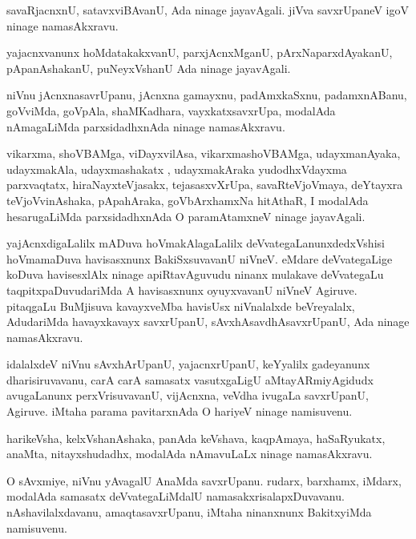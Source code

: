 \documentclass{article}
\begin{document}
\begin{mn}
savaRjacnxnU, satavxviBAvanU, Ada ninage jayavAgali.  jiVva savxrUpaneV igoV ninage namasAkxravu.
\end{mn}

\begin{mn}
yajacnxvanunx  hoMdatakakxvanU, parxjAcnxMganU, pArxNaparxdAyakanU, pApanAshakanU, puNeyxVshanU Ada ninage jayavAgali.
\end{mn}

\begin{mn}
niVnu jAcnxnasavrUpanu, jAcnxna gamayxnu,  padAmxkaSxnu,  padamxnABanu, 
goVviMda, goVpAla, shaMKadhara, vayxkatxsavxrUpa, modalAda nAmagaLiMda 
parxsidadhxnAda ninage namasAkxravu.
\end{mn}

\begin{mn}
vikarxma,  shoVBAMga,  viDayxvilAsa,  vikarxmashoVBAMga, udayxmanAyaka, 
udayxmakAla, udayxmashakatx , udayxmakAraka yudodhxVdayxma parxvaqtatx,  
hiraNayxteVjasakx,  tejasasxvXrUpa, savaRteVjoVmaya,  deYtayxra teVjoVvinAshaka, 
pApahAraka, goVbArxhamxNa hitAthaR, I modalAda hesarugaLiMda parxsidadhxnAda  
O paramAtamxneV  ninage jayavAgali.
\end{mn}

\begin{mn}
yajAcnxdigaLalilx mADuva hoVmakAlagaLalilx deVvategaLanunxdedxVshisi hoVmamaDuva 
havisasxnunx BakiSxsuvavanU niVneV.  eMdare deVvategaLige koDuva havisesxlAlx 
ninage apiRtavAguvudu ninanx mulakave  deVvategaLu taqpitxpaDuvudariMda A  
havisasxnunx oyuyxvavanU niVneV Agiruve.  pitaqgaLu BuMjisuva kavayxveMba 
havisUsx niVnalalxde beVreyalalx, AdudariMda  havayxkavayx savxrUpanU, 
sAvxhAsavdhAsavxrUpanU, Ada ninage  namasAkxravu.
\end{mn}

\begin{mn}
idalalxdeV niVnu sAvxhArUpanU,  yajacnxrUpanU, keYyalilx gadeyanunx dharisiruvavanu, 
carA carA samasatx vasutxgaLigU aMtayARmiyAgidudx avugaLanunx perxVrisuvavanU,  
vijAcnxna, veVdha ivugaLa savxrUpanU, Agiruve.  iMtaha parama pavitarxnAda 
O hariyeV ninage  namisuvenu.
\end{mn}

\begin{mn}
harikeVsha, kelxVshanAshaka, panAda keVshava, kaqpAmaya, haSaRyukatx, anaMta, 
nitayxshudadhx, modalAda nAmavuLaLx ninage namasAkxravu. 
\end{mn}

\begin{mn}
O sAvxmiye, niVnu yAvagalU AnaMda savxrUpanu. rudarx, barxhamx, iMdarx, 
modalAda samasatx deVvategaLiMdalU  namasakxrisalapxDuvavanu. nAshavilalxdavanu, 
amaqtasavxrUpanu, iMtaha ninanxnunx BakitxyiMda namisuvenu.
\end{mn}
\end{document}

